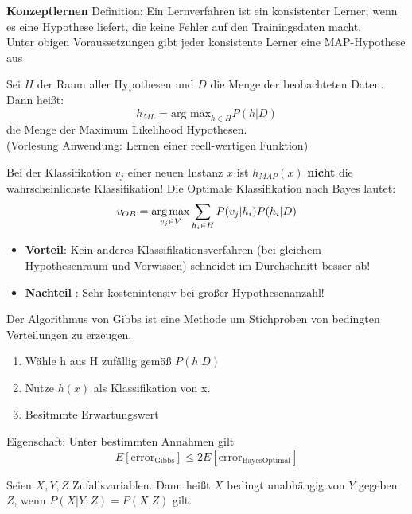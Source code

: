 \textbf{Konzeptlernen}
Definition: Ein Lernverfahren ist ein konsistenter Lerner, wenn es eine Hypothese
liefert, die keine Fehler auf den Trainingsdaten macht. \\
Unter obigen Voraussetzungen gibt jeder konsistente Lerner eine MAP-Hypothese aus

Sei $H$ der Raum aller Hypothesen und $D$ die Menge der beobachteten Daten.
Dann heißt:
\begin{displaymath}
    h_{ML} = \text{arg max}_{h \in H} P(h|D)
\end{displaymath}
die Menge der Maximum Likelihood Hypothesen.\\
(Vorlesung Anwendung: Lernen einer reell-wertigen Funktion)

Bei der Klassifikation $v_j$ einer neuen Instanz $x$ ist $h_{MAP}(x)$ \textbf{nicht}
die wahrscheinlichste Klassifikation!
Die Optimale Klassifikation nach Bayes lautet:
\begin{displaymath}
v_{OB} = \operatorname*{arg\,max}_{v_j \in V} \sum_{h_i \in H} P(v_j|h_i)P(h_i|D)
\end{displaymath}

\begin{itemize}
    \item \textbf{Vorteil}: Kein anderes Klassifikationsverfahren (bei gleichem
    Hypothesenraum und Vorwissen) schneidet im Durchschnitt besser ab!
    \item \textbf{Nachteil} : Sehr kostenintensiv bei großer Hypothesenanzahl!
\end{itemize}


Der Algorithmus von Gibbs ist eine Methode um Stichproben von bedingten
 Verteilungen zu erzeugen.

\begin{enumerate}
    \item Wähle h aus H zufällig gemäß $P(h|D)$
    \item Nutze $h(x)$ als Klassifikation von x.
    \item Besitmmte Erwartungswert
\end{enumerate}
Eigenschaft: Unter bestimmten Annahmen gilt
\begin{displaymath}
    E[\text{error}_{\text{Gibbs}}] \leq 2E[\text{error}_{\text{BayesOptimal}}]
\end{displaymath}

Seien $X, Y, Z$ Zufallsvariablen. Dann heißt $X$ bedingt unabhängig
 von $Y$ gegeben $Z$, wenn $P(X|Y,Z) = P(X|Z)$ gilt.

